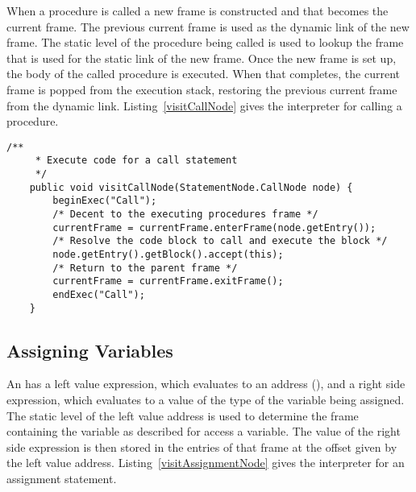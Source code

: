 \documentclass[a4paper,twoside]{article}
\begin{document}
When a procedure is called a new frame is constructed and that becomes the current frame. 
The previous current frame is used as the dynamic link of the new frame.
The static level of the procedure being called is used to lookup the frame 
that is used for the static link of the new frame. 
Once the new frame is set up, the body of the called procedure is executed.
When that completes, the current frame is popped from the execution stack,
restoring the previous current frame from the dynamic link.
Listing~\ref{visitCallNode} gives the interpreter for calling a procedure.

\begin{figure*}[ht]
\begin{lstlisting}[caption=Interpreter for calling a procedure, label=visitCallNode]
    /**
     * Execute code for a call statement
     */
    public void visitCallNode(StatementNode.CallNode node) {
        beginExec("Call");
        /* Decent to the executing procedures frame */
        currentFrame = currentFrame.enterFrame(node.getEntry());
        /* Resolve the code block to call and execute the block */
        node.getEntry().getBlock().accept(this);
        /* Return to the parent frame */
        currentFrame = currentFrame.exitFrame();
        endExec("Call");
    }
\end{lstlisting}

\end{figure*}


\subsection{Assigning Variables}\label{section:assignment}

An  has a left value expression, 
which evaluates to an address (),
and a right side expression, 
which evaluates to a value of the type of the variable being assigned.
The static level of the left value address is used to determine the frame containing the variable
as described for access a variable.
The value of the right side expression is then stored in the entries of that frame at the offset
given by the left value address.
Listing~\ref{visitAssignmentNode} gives the interpreter for an assignment statement.
\end{document}
